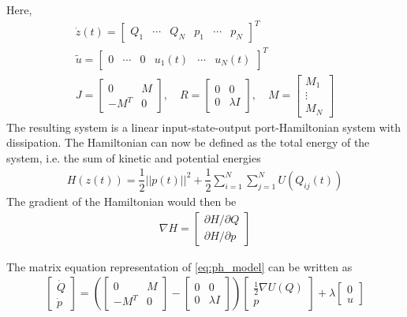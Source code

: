 Here,
\begin{gather}
    \dot z(t) = 
    \begin{bmatrix}
        Q_1 & \cdots & Q_N & p_1 & \cdots & p_N 
    \end{bmatrix}^T
    \\
    \tilde u = \begin{bmatrix} 0 & \cdots & 0 & u_1(t) & \cdots & u_N(t) \end{bmatrix}^T
    \\
    J =
    \begin{bmatrix}
        0 & M \\
        -M^T & 0 
    \end{bmatrix},
    \quad 
    R =
    \begin{bmatrix}
        0 & 0 \\
        0 & \lambda I
    \end{bmatrix},
    \quad
    M = 
    \begin{bmatrix}
        M_1 \\ \vdots \\ M_N
    \end{bmatrix}
    \label{eq:JRM}
\end{gather}
The resulting system is a linear input-state-output port-Hamiltonian system with dissipation. The Hamiltonian can now be defined as the total energy of the system, i.e. the sum of kinetic and potential energies
\begin{align}
    H(z(t)) = \dfrac{1}{2}||p(t)||^2 + \dfrac{1}{2}\sum_{i=1}^N\sum_{j=1}^NU(Q_{ij}(t))
    \label{eq:Hamiltonian}
\end{align}
The gradient of the Hamiltonian would then be
\begin{gather}
    \nabla H = 
    \begin{bmatrix}
        \partial H / \partial Q \\ \partial H / \partial p
    \end{bmatrix}
    \label{eq:Hamiltonian_partial}
\end{gather}

The matrix equation representation of \autoref{eq:ph_model} can be written as
\begin{gather}
    \begin{bmatrix}
        \dot Q \\ \dot p
    \end{bmatrix} =
    \left(
    \begin{bmatrix}
        0 & M \\ 
        -M^T & 0
    \end{bmatrix} -
    \begin{bmatrix}
        0 & 0 \\
        0 & \lambda I
    \end{bmatrix} \right)
    \begin{bmatrix}
        \frac{1}{2} \nabla U(Q) \\
        p 
    \end{bmatrix}
    + \lambda 
    \begin{bmatrix}
        0 \\ u
    \end{bmatrix}
    \label{eq:matrixeq_ph}
\end{gather}


